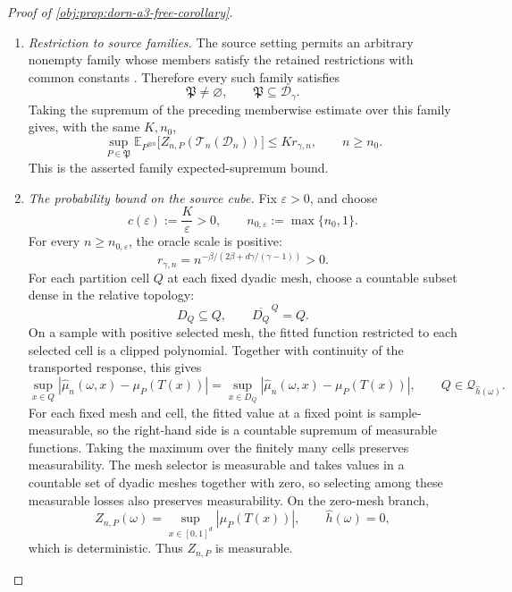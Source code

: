 \begin{proof}[Proof of \cref{obj:prop:dorn-a3-free-corollary}]
\begin{enumerate}
\item \emph{Restriction to source families.}
The source setting permits an arbitrary nonempty family whose members satisfy the retained restrictions with common constants
\citep[Section 2, Assumptions 1--2, pp.~3--7]{Dorn2026GlobalOverlap}.
Therefore every such family satisfies
\[
\mathfrak P\ne\varnothing,
\qquad
\mathfrak P\subseteq\mathcal D_\gamma.
\]
Taking the supremum of the preceding memberwise estimate over this family gives, with the same \(K,n_0\),
\[
\sup_{P\in\mathfrak P}
\mathbb E_{P^{\otimes n}}
\bigl[Z_{n,P}(\mathcal T_n(\mathcal D_n))\bigr]
\le K r_{\gamma,n},
\qquad n\ge n_0.
\]
This is the asserted family expected-supremum bound.

\item \emph{The probability bound on the source cube.}
Fix \(\varepsilon>0\), and choose
\[
c(\varepsilon):=\frac K\varepsilon>0,
\qquad
n_{0,\varepsilon}:=\max\{n_0,1\}.
\]
For every \(n\ge n_{0,\varepsilon}\), the oracle scale is positive:
\[
r_{\gamma,n}
=
n^{-\beta/(2\beta+d\gamma/(\gamma-1))}>0.
\]
For each partition cell \(Q\) at each fixed dyadic mesh, choose a countable subset dense in the relative topology:
\[
D_Q\subseteq Q,
\qquad
\overline{D_Q}^{\,Q}=Q.
\]
On a sample with positive selected mesh, the fitted function restricted to each selected cell is a clipped polynomial. Together with continuity of the transported response, this gives
\[
\sup_{x\in Q}
|\widehat\mu_n(\omega,x)-\mu_P(T(x))|
=
\sup_{x\in D_Q}
|\widehat\mu_n(\omega,x)-\mu_P(T(x))|,
\qquad Q\in\mathcal Q_{\widehat h(\omega)}.
\]
For each fixed mesh and cell, the fitted value at a fixed point is sample-measurable, so the right-hand side is a countable supremum of measurable functions. Taking the maximum over the finitely many cells preserves measurability. The mesh selector is measurable and takes values in a countable set of dyadic meshes together with zero, so selecting among these measurable losses also preserves measurability. On the zero-mesh branch,
\[
Z_{n,P}(\omega)
=
\sup_{x\in[0,1]^d}|\mu_P(T(x))|,
\qquad \widehat h(\omega)=0,
\]
which is deterministic. Thus \(Z_{n,P}\) is measurable.


\end{enumerate}
\end{proof}
